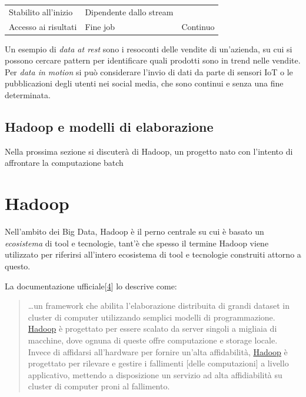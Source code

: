 \documentclass[italian,a4paper, twoside, 12pt]{report}
\begin{document}
\begin{longtable}[]{@{}lll@{}}
\begin{minipage}[t]{0.21\columnwidth}
Stabilito all'inizio\strut
\end{minipage} & \begin{minipage}[t]{0.43\columnwidth}\raggedright\strut
Dipendente dallo stream\strut
\end{minipage}\tabularnewline
\begin{minipage}[t]{0.27\columnwidth}\raggedright\strut
Accesso ai risultati\strut
\end{minipage} & \begin{minipage}[t]{0.21\columnwidth}\raggedright\strut
Fine job\strut
\end{minipage} & \begin{minipage}[t]{0.43\columnwidth}\raggedright\strut
Continuo\strut
\end{minipage}\tabularnewline
\bottomrule
\end{longtable}

Un esempio di \emph{data at rest} sono i resoconti delle vendite di
un'azienda, su cui si possono cercare pattern per identificare quali
prodotti sono in trend nelle vendite. Per \emph{data in motion} si può
considerare l'invio di dati da parte di sensori IoT o le pubblicazioni
degli utenti nei social media, che sono continui e senza una fine
determinata.

\section{Hadoop e modelli di
elaborazione}\label{hadoop-e-modelli-di-elaborazione}

Nella prossima sezione si discuterà di Hadoop, un progetto nato con
l'intento di affrontare la computazione batch

\hypertarget{hadoop}{\chapter{Hadoop}\label{hadoop}}

Nell'ambito dei Big Data, Hadoop è il perno centrale su cui è basato un
\emph{ecosistema} di tool e tecnologie, tant'è che spesso il termine
Hadoop viene utilizzato per riferirsi all'intero ecosistema di tool e
tecnologie construiti attorno a questo.

La documentazione
ufficiale{[}\protect\hyperlink{ref-hadoop-doc-main}{4}{]} lo descrive
come:

\begin{quote}
\ldots{}un framework che abilita l'elaborazione distribuita di grandi
dataset in cluster di computer utilizzando semplici modelli di
programmazione. \protect\hyperlink{hadoop}{Hadoop} è progettato per
essere scalato da server singoli a migliaia di macchine, dove ognuna di
queste offre computazione e storage locale. Invece di affidarsi
all'hardware per fornire un'alta affidabilità,
\protect\hyperlink{hadoop}{Hadoop} è progettato per rilevare e gestire i
fallimenti {[}delle computazioni{]} a livello applicativo, mettendo a
disposizione un servizio ad alta affidiabilità su cluster di computer
proni al fallimento.
\end{quote}
\end{document}
